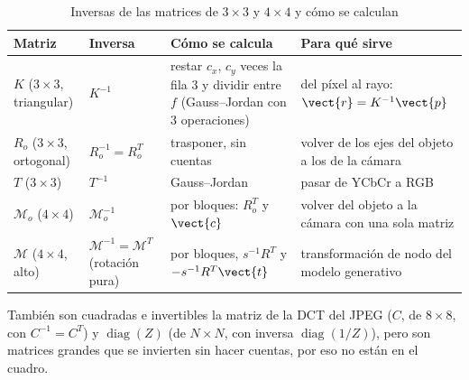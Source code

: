 \begin{table}[htbp]
\caption{Inversas de las matrices de $3\times3$ y $4\times4$ y cómo se calculan}
\label{tab:inversas-proceso}
\centering\small
\begin{tabular}{@{}p{2.1cm}p{2.9cm}p{4.2cm}p{4.2cm}@{}}
\toprule
Matriz & Inversa & Cómo se calcula & Para qué sirve \\
\midrule
$K$ ($3\times3$, triangular) & $K^{-1}$ & restar $c_x$, $c_y$ veces la fila 3 y dividir entre $f$ (Gauss--Jordan con 3 operaciones) & del píxel al rayo: $\vect{r}=K^{-1}\vect{p}$ \\
$R_o$ ($3\times3$, ortogonal) & $R_o^{-1}=R_o^{T}$ & trasponer, sin cuentas & volver de los ejes del objeto a los de la cámara \\
$T$ ($3\times3$) & $T^{-1}$ & Gauss--Jordan & pasar de YCbCr a RGB \\
$\mathcal{M}_o$ ($4\times4$) & $\mathcal{M}_o^{-1}$ & por bloques: $R_o^{T}$ y $\vect{c}$ & volver del objeto a la cámara con una sola matriz \\
$\mathcal{M}$ ($4\times4$, alto) & $\mathcal{M}^{-1}=\mathcal{M}^{T}$ (rotación pura) & por bloques, $s^{-1}R^{T}$ y $-s^{-1}R^{T}\vect{t}$ & transformación de nodo del modelo generativo \\
\bottomrule
\end{tabular}
\end{table}

También son cuadradas e invertibles la matriz de la DCT del JPEG ($C$, de $8\times8$, con $C^{-1}=C^{T}$) y $\operatorname{diag}(Z)$ (de $N\times N$, con inversa
$\operatorname{diag}(1/Z)$), pero son matrices grandes que se invierten sin hacer cuentas, por eso no están en el cuadro.


